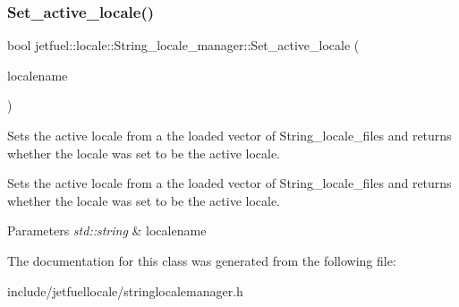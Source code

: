 \subsubsection{\texorpdfstring{Set\+\_\+active\+\_\+locale()}{Set\_active\_locale()}}
{\footnotesize\ttfamily bool jetfuel\+::locale\+::\+String\+\_\+locale\+\_\+manager\+::\+Set\+\_\+active\+\_\+locale (\begin{DoxyParamCaption}\item[{const std\+::string}]{localename }\end{DoxyParamCaption})\hspace{0.3cm}{\ttfamily [inline]}}



Sets the active locale from a the loaded vector of String\+\_\+locale\+\_\+files and returns whether the locale was set to be the active locale. 

Sets the active locale from a the loaded vector of String\+\_\+locale\+\_\+files and returns whether the locale was set to be the active locale.


\begin{DoxyParams}{Parameters}
{\em std\+::string} & localename \\
\hline
\end{DoxyParams}


The documentation for this class was generated from the following file\+:\begin{DoxyCompactItemize}
\item 
include/jetfuellocale/stringlocalemanager.\+h\end{DoxyCompactItemize}
